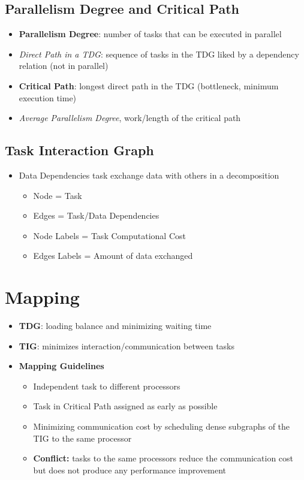 \documentclass[12pt,oneside]{report}
\begin{document}
\subsection{Parallelism Degree and Critical Path}
\begin{itemize}
    \item \textbf{Parallelism Degree}: number of tasks that can be executed in parallel
    \item \textit{Direct Path in a TDG}: sequence of tasks in the TDG liked by a dependency relation (not in parallel)
    \item \textbf{Critical Path}: longest direct path in the TDG (bottleneck, minimum execution time)
    \item \textit{Average Parallelism Degree}, work/length of the critical path
\end{itemize}

\subsection{Task Interaction Graph}
\begin{itemize}
    \item Data Dependencies task exchange data with others in a decomposition
    \begin{itemize}
        \item Node = Task
        \item Edges = Task/Data Dependencies
        \item Node Labels = Task Computational Cost 
        \item Edges Labels = Amount of data exchanged 
    \end{itemize}
\end{itemize}

\section{Mapping}
\begin{itemize}
    \item \textbf{TDG}: loading balance and minimizing waiting time
    \item \textbf{TIG}: minimizes interaction/communication between tasks
    \item \textbf{Mapping Guidelines}
    \begin{itemize}
        \item Independent task to different processors
        \item Task in Critical Path assigned as early as possible
        \item Minimizing communication cost by scheduling dense subgraphs of the TIG to the same processor
        \item \textbf{Conflict:} tasks to the same processors reduce the communication cost but does not produce any performance improvement
    \end{itemize}
\end{itemize}
\end{document}
